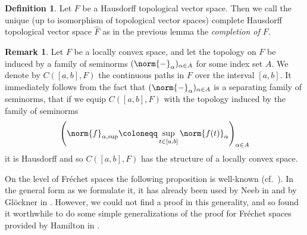\documentclass[12pt,a4paper]{article}
\theoremstyle{plain}
\theoremstyle{definition}
\newtheorem{definition}[theorem]{Definition}
\newtheorem{remark}[theorem]{Remark}
\newcommand{\nnorm}[2]{\norm{#1}_{#2}}
\begin{document}
\begin{definition}
Let $F$ be a Hausdorff topological vector space. Then we call the unique (up to isomorphism of topological vector spaces) complete Hausdorff topological vector space  $\hat{F}$ as in the previous lemma the \textit{completion of $F$}.
\end{definition}


\begin{remark}
\label{Rem:TopOnContPaths}
Let $F$ be a locally convex space, and let the topology on $F$ be induced by a family of seminorms $(\nnorm{-}{\alpha})_{\alpha\in A}$ for some index set $A$.
We denote by $C([a,b],F)$ the continuous paths in $F$ over the interval $[a,b]$. It immediately follows from the fact that $(\nnorm{-}{\alpha})_{\alpha\in A}$ is a separating family of seminorms, that if we equip $C([a,b],F)$ with the topology induced by the family of seminorms 
\begin{align}
\label{Eq:SupNormOnC([a,b],F)}
    \left(\nnorm{f}{\alpha,\mathrm{sup}}\coloneqq \sup_{t\in [a,b]}\nnorm{f(t)}{\alpha}\right)_{\alpha\in A}
\end{align}
it is Hausdorff and so $C([a,b],F)$ has the structure of a locally convex space.
\end{remark}

On the level of Fréchet spaces the following proposition is well-known (cf.~\cite[Part I, Theorem 2.1.1]{hamilton}). In the general form as we formulate it, it has already been used by Neeb in \cite{InfDimLieneeb} and by Glöckner in \cite{GlockInfDimLieGr}. However, we could not find a proof in this generality, and so found it worthwhile to do some simple generalizations of the proof for Fréchet spaces provided by Hamilton in \cite[Part I, Theorem 2.1.1]{hamilton}.
\end{document}
